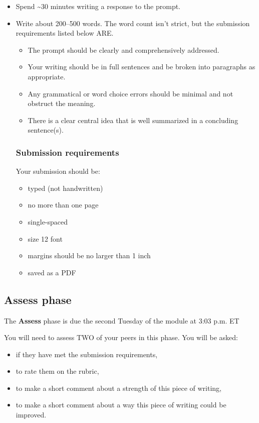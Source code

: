 \documentclass[
  openany]{book}
\begin{document}
\begin{itemize}
\item
  Spend \textasciitilde30 minutes writing a response to the prompt.
\item
  Write about 200--500 words. The word count isn't strict, but the submission requirements listed below ARE.

  \begin{itemize}
  \item
    The prompt should be clearly and comprehensively addressed.
  \item
    Your writing should be in full sentences and be broken into paragraphs as appropriate.
  \item
    Any grammatical or word choice errors should be minimal and not obstruct the meaning.
  \item
    There is a clear central idea that is well summarized in a concluding sentence(s).
  \end{itemize}

  \hypertarget{submission-requirements}{%
  \subsubsection{Submission requirements}\label{submission-requirements}}

  Your submission should be:

  \begin{itemize}
  \item
    typed (not handwritten)
  \item
    no more than one page
  \item
    single-spaced
  \item
    size 12 font
  \item
    margins should be no larger than 1 inch
  \item
    saved as a PDF
  \end{itemize}
\end{itemize}

\hypertarget{assess-phase}{%
\subsection{Assess phase}\label{assess-phase}}

The \textbf{Assess} phase is due the second Tuesday of the module at 3:03 p.m. ET

You will need to assess TWO of your peers in this phase. You will be asked:

\begin{itemize}
\item
  if they have met the submission requirements,
\item
  to rate them on the rubric,
\item
  to make a short comment about a strength of this piece of writing,
\item
  to make a short comment about a way this piece of writing could be improved.
\end{itemize}
\end{document}
